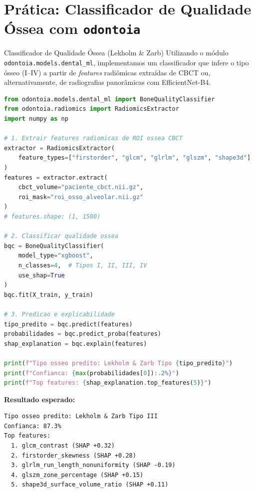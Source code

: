 
\section{Prática: Classificador de Qualidade Óssea com \texttt{odontoia}}

\begin{pratica}{Classificador de Qualidade Óssea (Lekholm \& Zarb)}
Utilizando o módulo \texttt{odontoia.models.dental\_ml}, implementamos um classificador que infere o tipo ósseo (I--IV) a partir de \textit{features} radiômicas extraídas de CBCT ou, alternativamente, de radiografias panorâmicas com EfficientNet-B4.

\begin{lstlisting}[language=Python, caption={Classificador de qualidade óssea tipo Lekholm \& Zarb}]
from odontoia.models.dental_ml import BoneQualityClassifier
from odontoia.radiomics import RadiomicsExtractor
import numpy as np

# 1. Extrair features radiomicas de ROI ossea CBCT
extractor = RadiomicsExtractor(
    feature_types=["firstorder", "glcm", "glrlm", "glszm", "shape3d"]
)
features = extractor.extract(
    cbct_volume="paciente_cbct.nii.gz",
    roi_mask="roi_osso_alveolar.nii.gz"
)
# features.shape: (1, 1500)

# 2. Classificar qualidade ossea
bqc = BoneQualityClassifier(
    model_type="xgboost",
    n_classes=4,  # Tipos I, II, III, IV
    use_shap=True
)
bqc.fit(X_train, y_train)

# 3. Predicao e explicabilidade
tipo_predito = bqc.predict(features)
probabilidades = bqc.predict_proba(features)
shap_explanation = bqc.explain(features)

print(f"Tipo osseo predito: Lekholm & Zarb Tipo {tipo_predito}")
print(f"Confianca: {max(probabilidades[0]):.2%}")
print(f"Top features: {shap_explanation.top_features(5)}")
\end{lstlisting}

\textbf{Resultado esperado:}
\begin{lstlisting}[style=saida]
Tipo osseo predito: Lekholm & Zarb Tipo III
Confianca: 87.3%
Top features:
  1. glcm_contrast (SHAP +0.32)
  2. firstorder_skewness (SHAP +0.28)
  3. glrlm_run_length_nonuniformity (SHAP -0.19)
  4. glszm_zone_percentage (SHAP +0.15)
  5. shape3d_surface_volume_ratio (SHAP +0.11)
\end{lstlisting}
\end{pratica}


